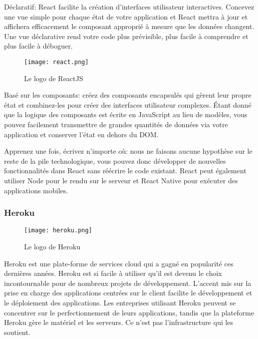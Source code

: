 \begin{enumerate}
        Déclaratif: React facilite la création d'interfaces utilisateur interactives. Concevez une vue simple pour chaque état de votre application et React mettra à jour et affichera efficacement le composant approprié à mesure que les  données changent. Une vue déclarative rend votre code plus prévisible, plus facile à comprendre et plus facile à déboguer. 
 
        \begin{figure}[H]
            \centering
            \texttt{[image: react.png]}
            \caption{Le logo de ReactJS}\label{fig:react}
        \end{figure}
        
        
        Basé sur les composants: créez des composants encapsulés qui gèrent leur propre état et combinez-les pour créer des interfaces utilisateur complexes. Étant donné que la logique des composants est écrite en JavaScript au lieu de modèles, vous pouvez facilement transmettre de grandes quantités de données  via votre application et conserver l'état en dehors du DOM.
 
        Apprenez une fois, écrivez n'importe où: nous ne faisons aucune hypothèse sur le reste de la pile technologique, vous pouvez donc développer de nouvelles fonctionnalités dans React sans réécrire le code existant. React peut également utiliser Node pour le rendu sur le serveur  et React Native pour exécuter des applications mobiles.

        \bfseries
    \end{enumerate}
    \subsubsection{Heroku}
    \begin{figure}[H]
        \centering
        \texttt{[image: heroku.png]}
        \caption{Le logo de Heroku}\label{fig:heroku}
    \end{figure}

    Heroku est une plate-forme de services cloud qui a gagné en popularité  ces dernières années. Heroku est si facile à utiliser qu'il est devenu le choix incontournable pour de nombreux projets de développement. 
    L'accent mis sur la prise en charge des applications centrées sur le client facilite le développement et le déploiement  des applications. Les entreprises utilisant Heroku peuvent se concentrer sur le perfectionnement de leurs applications, tandis que la plateforme Heroku gère le matériel et les serveurs. Ce n'est pas l'infrastructure qui les soutient.

